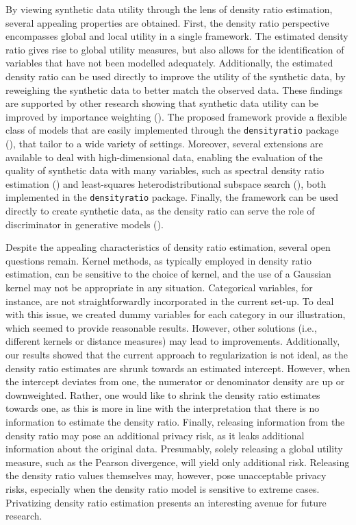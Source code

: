 \documentclass[
]{article}
\begin{document}
By viewing synthetic data utility through the lens of density ratio
estimation, several appealing properties are obtained. First, the
density ratio perspective encompasses global and local utility in a
single framework. The estimated density ratio gives rise to global
utility measures, but also allows for the identification of variables
that have not been modelled adequately. Additionally, the estimated
density ratio can be used directly to improve the utility of the
synthetic data, by reweighing the synthetic data to better match the
observed data. These findings are supported by other research showing
that synthetic data utility can be improved by importance weighting
(). The
proposed framework provide a flexible class of models that are easily
implemented through the \texttt{densityratio} package
(), that tailor to a wide
variety of settings. Moreover, several extensions are available to deal
with high-dimensional data, enabling the evaluation of the quality of
synthetic data with many variables, such as spectral density ratio
estimation () and least-squares heterodistributional subspace search
(), both
implemented in the \texttt{densityratio} package. Finally, the framework
can be used directly to create synthetic data, as the density ratio can
serve the role of discriminator in generative models
().

Despite the appealing characteristics of density ratio estimation,
several open questions remain. Kernel methods, as typically employed in
density ratio estimation, can be sensitive to the choice of kernel, and
the use of a Gaussian kernel may not be appropriate in any situation.
Categorical variables, for instance, are not straightforwardly
incorporated in the current set-up. To deal with this issue, we created
dummy variables for each category in our illustration, which seemed to
provide reasonable results. However, other solutions (i.e., different
kernels or distance measures) may lead to improvements. Additionally,
our results showed that the current approach to regularization is not
ideal, as the density ratio estimates are shrunk towards an estimated
intercept. However, when the intercept deviates from one, the numerator
or denominator density are up or downweighted. Rather, one would like to
shrink the density ratio estimates towards one, as this is more in line
with the interpretation that there is no information to estimate the
density ratio. Finally, releasing information from the density ratio may
pose an additional privacy risk, as it leaks additional information
about the original data. Presumably, solely releasing a global utility
measure, such as the Pearson divergence, will yield only additional
risk. Releasing the density ratio values themselves may, however, pose
unacceptable privacy risks, especially when the density ratio model is
sensitive to extreme cases. Privatizing density ratio estimation
presents an interesting avenue for future research.
\end{document}
